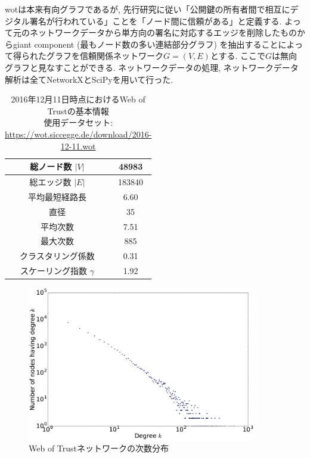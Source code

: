 \documentclass[dvipdfmx]{ampbt}
\begin{document}
  \acrshort{wot}は本来有向グラフであるが, 先行研究に従い「公開鍵の所有者間で相互にデジタル署名が行われている」ことを「ノード間に信頼がある」と定義する. よって元のネットワークデータから単方向の署名に対応するエッジを削除したものからgiant component (最もノード数の多い連結部分グラフ) を抽出することによって得られたグラフを信頼関係ネットワーク$G=(V,E)$とする. ここで$G$は無向グラフと見なすことができる. ネットワークデータの処理, ネットワークデータ解析は全てNetworkX\cite{hagberg2008exploring}とSciPy\cite{scipy2001}を用いて行った.
  \begin{table}[htbp]
   \begin{center}  
    \begin{tabular}{|c|c|} \hline
    総ノード数 $|V|$ & 48983 \\ \hline
    総エッジ数 $|E|$ & 183840 \\ \hline
    平均最短経路長 & 6.60 \\ \hline
    直径 & 35 \\ \hline
    平均次数 &  7.51 \\ \hline
    最大次数 & 885 \\ \hline
    クラスタリング係数 & 0.31\\ \hline
    スケーリング指数 $\gamma$ & 1.92 \\ \hline
    \end{tabular}
   \end{center}
   \caption{2016年12月11日時点におけるWeb of Trustの基本情報 \\ 使用データセット: \url{https://wot.siccegge.de/download/2016-12-11.wot}}
   \label{table:wot_info}
  \end{table}

    \begin{figure}[htbp]
     \centerline{\includegraphics[width=100mm]{../fig/wot_degree_distribution.eps}}
     \caption{Web of Trustネットワークの次数分布}
     \label{fig:wot_dd}
    \end{figure}
\end{document}
